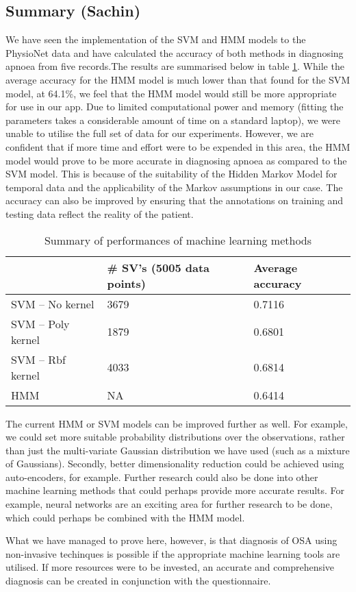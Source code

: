 \subsection{Summary (Sachin)}
\label{sec:mlExperimentsSummary}

We have seen the implementation of the SVM and HMM models to the PhysioNet data and have calculated the accuracy of both methods in diagnosing apnoea from five records.The results are summarised below in table \ref{table:mlResults}. While the average accuracy for the HMM model is much lower than that found for the SVM model, at 64.1\%, we feel that the HMM model would still be more appropriate for use in our app. Due to limited computational power and memory (fitting the parameters takes a considerable amount of time on a standard laptop), we were unable to utilise the full set of data for our experiments. However, we are confident that if more time and effort were to be expended in this area, the HMM model would prove to be more accurate in diagnosing apnoea as compared to the SVM model. This is because of the suitability of the Hidden Markov Model for temporal data and the applicability of the Markov assumptions in our case. The accuracy can also be improved by ensuring that the annotations on training and testing data reflect the reality of the patient.

\begin{table}[h]
		\centering
		\begin{tabular}{@{}lll@{}}
		\toprule
		            & \# SV's (5005 data points) & Average accuracy \\ \midrule
		SVM -- No kernel   & 3679                       & 0.7116           \\
		SVM -- Poly kernel & 1879                       & 0.6801           \\
		SVM -- Rbf kernel  & 4033                       & 0.6814           \\
		HMM & NA & 0.6414 \\ \bottomrule

		\end{tabular}
		\caption{Summary of performances of machine learning methods}
		\label{table:mlResults}
	\end{table}

The current HMM or SVM models can be improved further as well. For example, we could set more suitable probability distributions over the observations, rather than just the multi-variate Gaussian distribution we have used (such as a mixture of Gaussians). Secondly, better dimensionality reduction could be achieved using auto-encoders, for example. Further research could also be done into other machine learning methods that could perhaps provide more accurate results. For example, neural networks are an exciting area for further research to be done, which could perhaps be combined with the HMM model.

What we have managed to prove here, however, is that diagnosis of OSA using non-invasive techinques is possible if the appropriate machine learning tools are utilised. If more resources were to be invested, an accurate and comprehensive diagnosis can be created in conjunction with the questionnaire.